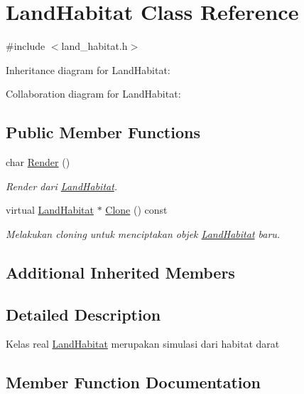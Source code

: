 \hypertarget{classLandHabitat}{}\section{Land\+Habitat Class Reference}
\label{classLandHabitat}


{\ttfamily \#include $<$land\+\_\+habitat.\+h$>$}



Inheritance diagram for Land\+Habitat\+:


Collaboration diagram for Land\+Habitat\+:
\subsection*{Public Member Functions}
\begin{DoxyCompactItemize}
\item 
char \hyperlink{classLandHabitat_ad2147498f493b01429ae315f0145d3a9}{Render} ()
\begin{DoxyCompactList}\small\item\em Render dari \hyperlink{classLandHabitat}{Land\+Habitat}. \end{DoxyCompactList}\item 
virtual \hyperlink{classLandHabitat}{Land\+Habitat} $\ast$ \hyperlink{classLandHabitat_a8cd927afc8d52a9fb8cdc5701893ad81}{Clone} () const 
\begin{DoxyCompactList}\small\item\em Melakukan cloning untuk menciptakan objek \hyperlink{classLandHabitat}{Land\+Habitat} baru. \end{DoxyCompactList}\end{DoxyCompactItemize}
\subsection*{Additional Inherited Members}


\subsection{Detailed Description}
Kelas real \hyperlink{classLandHabitat}{Land\+Habitat} merupakan simulasi dari habitat darat 

\subsection{Member Function Documentation}
